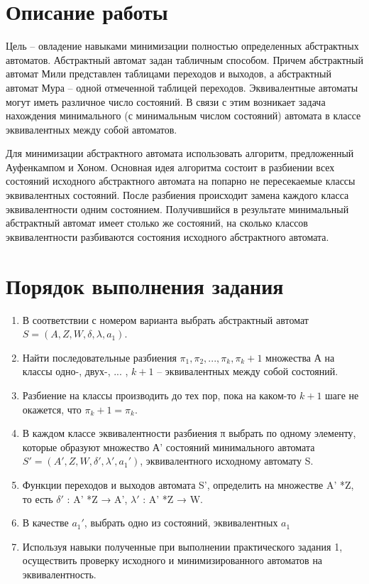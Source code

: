 
\def \labnum {2}
\def \labsubj {Теория автоматов}
\def \labauthor {Чебыкин И. Б.}
\def \labgroup {P3301}
\def \labinsp {Ожиганов А. А.}
\def \labname {Минимизация абстрактных автоматов \\ Вариант: 5}
\isnametrue

\usepackage{listings,longtable,amsmath,amsfonts,graphicx,tikz,tabularx,pgf,multirow}
\usepackage{caption}
\usetikzlibrary{arrows,automata}

\captionsetup{labelsep=period}
\pagestyle{fancy}



\section{Описание работы}
Цель -- овладение навыками минимизации полностью определенных абстрактных автоматов.
Абстрактный автомат задан табличным способом. Причем абстрактный автомат Мили
представлен таблицами переходов и выходов, а абстрактный автомат Мура -- одной
отмеченной таблицей переходов. Эквивалентные автоматы могут иметь различное
число состояний. В связи с этим возникает задача нахождения минимального
(с минимальным числом состояний) автомата в классе эквивалентных между собой
автоматов.

Для минимизации абстрактного автомата использовать алгоритм,
предложенный Ауфенкампом и Хоном. Основная идея алгоритма состоит в разбиении
всех состояний исходного абстрактного автомата на попарно не пересекаемые классы
эквивалентных состояний. После разбиения происходит замена каждого класса
эквивалентности одним состоянием. Получившийся в результате минимальный
абстрактный автомат имеет столько же состояний, на сколько классов
эквивалентности разбиваются состояния исходного абстрактного автомата.
\section{Порядок выполнения задания}
\begin{enumerate}
\item В соответствии с номером варианта выбрать
абстрактный автомат $S=(A,Z,W,\delta,\lambda,a_1)$.
\item Найти последовательные разбиения $\pi_1, \pi_2,..., \pi_k, \pi_k+1$
множества А на классы одно-, двух-, ... , $k+1$ -- эквивалентных между собой состояний.
\item Разбиение на классы производить до тех пор, пока на каком-то $k+1$ шаге
не окажется, что $\pi_k+1 = \pi_k.$
\item В каждом классе эквивалентности разбиения π выбрать по одному элементу,
которые образуют множество А' состояний минимального
автомата $S'=(A',Z,W,\delta',\lambda',a_1')$, эквивалентного исходному автомату S.
\item Функции переходов и выходов автомата S', определить на множестве A' *Z,
то есть $\delta'$ : A' *Z → A', $\lambda'$ : A' *Z → W.
\item В качестве $a_1'$, выбрать одно из состояний, эквивалентных $a_1$
\item Используя навыки полученные при выполнении практического задания 1,
осуществить проверку исходного и минимизированного автоматов на эквивалентность.
\end{enumerate}
